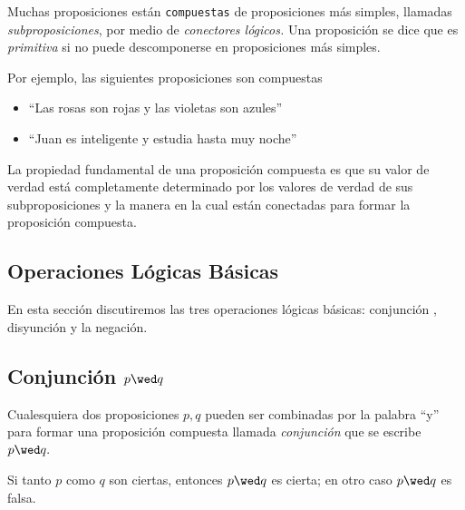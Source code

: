     Muchas proposiciones están \texttt{compuestas} de proposiciones más simples, llamadas \emph{subproposiciones}, por medio de \emph{conectores lógicos.}  Una proposición se dice que es \emph{primitiva} si no puede descomponerse en proposiciones más simples.



    Por ejemplo, las siguientes proposiciones son compuestas
    \begin{itemize}
        \item ``Las rosas son rojas y las violetas son azules''
        \item ``Juan es inteligente y estudia hasta muy noche''
    \end{itemize}
    



    La propiedad fundamental de una proposición compuesta es que su valor de verdad está completamente determinado por los valores de verdad de sus subproposiciones y la manera en la cual están conectadas para formar la proposición compuesta. 


\subsection{Operaciones Lógicas Básicas}


    En esta sección discutiremos las tres operaciones lógicas básicas: conjunción , disyunción  y la negación.


\subsection{Conjunción $p \wed q$}


    Cualesquiera dos proposiciones $p,q$ pueden ser combinadas por la palabra ``y'' para formar una proposición compuesta llamada \emph{conjunción} que se escribe $p\wed q.$



    \begin{definicion}
        Si tanto $p$ como $q$ son ciertas, entonces $p \wed q$ es cierta; en otro caso $p\wed q$ es falsa.
    \end{definicion}	

